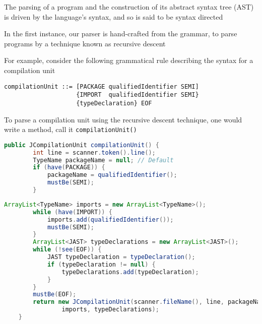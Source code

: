 \documentclass[8pt,a4paper,compress]{beamer}
\begin{document}
\begin{frame}[fragile]
\pause

The parsing of a \jmm program and the construction of its abstract syntax tree (AST) is driven by the language's syntax, and so is said to be syntax directed

\pause
\bigskip

In the first instance, our parser is hand-crafted from the \jmm grammar, to parse \jmm programs by a technique known as recursive descent

\pause
\bigskip

For example, consider the following grammatical rule describing the syntax for a compilation unit
\begin{lstlisting}[language={}]
compilationUnit ::= [PACKAGE qualifiedIdentifier SEMI]
                    {IMPORT  qualifiedIdentifier SEMI}
                    {typeDeclaration} EOF 
\end{lstlisting}

\pause
\bigskip

To parse a compilation unit using the recursive descent technique, one would write a method, call it \lstinline{compilationUnit()}

\begin{lstlisting}[language=Java]
    public JCompilationUnit compilationUnit() {
        int line = scanner.token().line();
        TypeName packageName = null; // Default
        if (have(PACKAGE)) {
            packageName = qualifiedIdentifier();
            mustBe(SEMI);
        }
\end{lstlisting}
\end{frame}

\begin{frame}[fragile]
\pause

\begin{lstlisting}[language=Java]
        ArrayList<TypeName> imports = new ArrayList<TypeName>();
        while (have(IMPORT)) {
            imports.add(qualifiedIdentifier());
            mustBe(SEMI);
        }
        ArrayList<JAST> typeDeclarations = new ArrayList<JAST>();
        while (!see(EOF)) {
            JAST typeDeclaration = typeDeclaration();
            if (typeDeclaration != null) {
                typeDeclarations.add(typeDeclaration);
            }
        }
        mustBe(EOF);
        return new JCompilationUnit(scanner.fileName(), line, packageName,
                imports, typeDeclarations);
    }
\end{lstlisting}
\end{frame}
\end{document}
